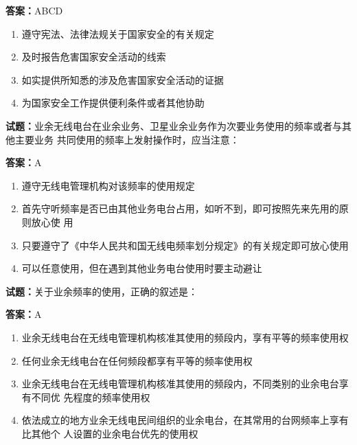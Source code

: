 \documentclass{ctexbook}
\begin{document}
\textbf{答案：}ABCD 

\begin{enumerate}[leftmargin=3em]
  \item 遵守宪法、法律法规关于国家安全的有关规定 

  \item 及时报告危害国家安全活动的线索 

  \item 如实提供所知悉的涉及危害国家安全活动的证据 

  \item 为国家安全工作提供便利条件或者其他协助 

\end{enumerate}





\vspace{1em}

\textbf{试题：}业余无线电台在业余业务、卫星业余业务作为次要业务使用的频率或者与其他主要业务
共同使用的频率上发射操作时，应当注意： 

\textbf{答案：}A 

\begin{enumerate}[leftmargin=3em]
  \item 遵守无线电管理机构对该频率的使用规定 

  \item 首先守听频率是否已由其他业务电台占用，如听不到，即可按照先来先用的原则放心使
用 

  \item 只要遵守了《中华人民共和国无线电频率划分规定》的有关规定即可放心使用 

  \item 可以任意使用，但在遇到其他业务电台使用时要主动避让 

\end{enumerate}





\vspace{1em}

\textbf{试题：}关于业余频率的使用，正确的叙述是： 

\textbf{答案：}A 

\begin{enumerate}[leftmargin=3em]
  \item 业余无线电台在无线电管理机构核准其使用的频段内，享有平等的频率使用权 

  \item 任何业余无线电台在任何频段都享有平等的频率使用权 

  \item 业余无线电台在无线电管理机构核准其使用的频段内，不同类别的业余电台享有不同优
先程度的频率使用权 

  \item 依法成立的地方业余无线电民间组织的业余电台，在其常用的台网频率上享有比其他个
人设置的业余电台优先的使用权 

\end{enumerate}
\end{document}
